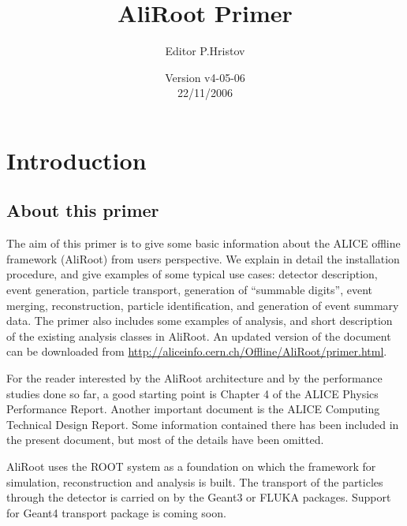 \documentclass[12pt,a4paper,twoside]{article}
\begin{document}
\title{AliRoot Primer}
\author{Editor P.Hristov}
\date{Version v4-05-06 \\
22/11/2006
}

\maketitle
\tableofcontents

\cleardoublepage 
\section{Introduction}\label{Introduction}



\subsection{About this primer}

The aim  of this primer  is to give  some basic information  about the
ALICE offline  framework (AliRoot) from users  perspective. We explain
in  detail  the installation  procedure,  and  give  examples of  some
typical  use cases: detector  description, event  generation, particle
transport,   generation  of   ``summable   digits'',  event   merging,
reconstruction,  particle  identification,  and  generation  of  event
summary data. The primer also  includes some examples of analysis, and
short  description of  the existing  analysis classes  in  AliRoot. An
updated   version   of   the   document   can   be   downloaded   from
\url{http://aliceinfo.cern.ch/Offline/AliRoot/primer.html}.

For  the reader  interested by  the  AliRoot architecture  and by  the
performance studies done so far, a good starting point is Chapter 4 of
the  ALICE  Physics  Performance Report\cite{PPR}.  Another  important
document is the ALICE Computing Technical Design Report\cite{CompTDR}.
Some  information contained  there has  been included  in  the present
document, but most of the details have been omitted.

AliRoot uses the  ROOT\cite{ROOT} system as a foundation  on which the
framework for  simulation, reconstruction  and analysis is  built. The
transport of the  particles through the detector is  carried on by the
Geant3\cite{Geant3}   or  FLUKA\cite{FLUKA}   packages.   Support  for
Geant4\cite{Geant4} transport package is coming soon.
\end{document}
